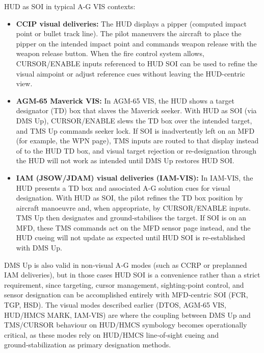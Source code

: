 \documentclass[11pt, a4paper, twoside]{report}
\begin{document}
HUD as SOI in typical A-G VIS contexts:

\begin{itemize}
	\item \textbf{CCIP visual deliveries:} The HUD displays a pipper (computed impact point or bullet track line). The pilot maneuvers the aircraft to place the pipper on the intended impact point and commands weapon release with the weapon release button. When the fire control system allows, CURSOR/ENABLE inputs referenced to HUD SOI can be used to refine the visual aimpoint or adjust reference cues without leaving the HUD-centric view.
	\item \textbf{AGM-65 Maverick VIS:} In AGM-65 VIS, the HUD shows a target designator (TD) box that slaves the Maverick seeker. With HUD as SOI (via DMS Up), CURSOR/ENABLE slews the TD box over the intended target, and TMS Up commands seeker lock. If SOI is inadvertently left on an MFD (for example, the WPN page), TMS inputs are routed to that display instead of to the HUD TD box, and visual target rejection or re-designation through the HUD will not work as intended until DMS Up restores HUD SOI.
	\item \textbf{IAM (JSOW/JDAM) visual deliveries (IAM-VIS):} In IAM-VIS, the HUD presents a TD box and associated A-G solution cues for visual designation. With HUD as SOI, the pilot refines the TD box position by aircraft manoeuvre and, when appropriate, by CURSOR/ENABLE inputs. TMS Up then designates and ground-stabilises the target. If SOI is on an MFD, these TMS commands act on the MFD sensor page instead, and the HUD cueing will not update as expected until HUD SOI is re-established with DMS Up.
\end{itemize}

DMS Up is also valid in non‑visual A‑G modes (such as CCRP or preplanned IAM deliveries), but in those cases HUD SOI is a convenience rather than a strict requirement, since targeting, cursor management, sighting‑point control, and sensor designation can be accomplished entirely with MFD‑centric SOI (FCR, TGP, HSD). The visual modes described earlier (DTOS, AGM‑65 VIS, HUD/HMCS MARK, IAM‑VIS) are where the coupling between DMS Up and TMS/CURSOR behaviour on HUD/HMCS symbology becomes operationally critical, as these modes rely on HUD/HMCS line‑of‑sight cueing and ground‑stabilization as primary designation methods.

\end{document}
